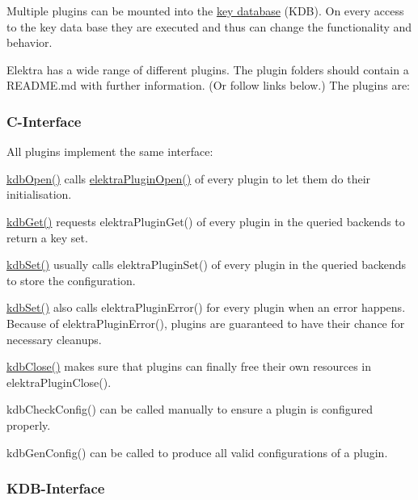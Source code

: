 Multiple plugins can be mounted into the \hyperlink{md_doc_help_elektra-glossary_doc_help_elektra-glossary_md}{key database} (K\+DB). On every access to the key data base they are executed and thus can change the functionality and behavior.

Elektra has a wide range of different plugins. The plugin folders should contain a R\+E\+A\+D\+M\+E.\+md with further information. (Or follow links below.) The plugins are\+:

 \subsubsection*{C-\/\+Interface}

All plugins implement the same interface\+:


\begin{DoxyItemize}
\item {\ttfamily \hyperlink{group__kdb_ga6808defe5870f328dd17910aacbdc6ca}{kdb\+Open()}} calls {\ttfamily \hyperlink{elektra_2plugin_8c_a32a70a7876542c51d153164ac5108a57}{elektra\+Plugin\+Open()}} of every plugin to let them do their initialisation.
\item {\ttfamily \hyperlink{group__kdb_ga28e385fd9cb7ccfe0b2f1ed2f62453a1}{kdb\+Get()}} requests {\ttfamily elektra\+Plugin\+Get()} of every plugin in the queried backends to return a key set.
\item {\ttfamily \hyperlink{group__kdb_ga11436b058408f83d303ca5e996832bcf}{kdb\+Set()}} usually calls {\ttfamily elektra\+Plugin\+Set()} of every plugin in the queried backends to store the configuration.
\item {\ttfamily \hyperlink{group__kdb_ga11436b058408f83d303ca5e996832bcf}{kdb\+Set()}} also calls {\ttfamily elektra\+Plugin\+Error()} for every plugin when an error happens. Because of {\ttfamily elektra\+Plugin\+Error()}, plugins are guaranteed to have their chance for necessary cleanups.
\item {\ttfamily \hyperlink{group__kdb_gadb54dc9fda17ee07deb9444df745c96f}{kdb\+Close()}} makes sure that plugins can finally free their own resources in {\ttfamily elektra\+Plugin\+Close()}.
\item {\ttfamily kdb\+Check\+Config()} can be called manually to ensure a plugin is configured properly.
\item {\ttfamily kdb\+Gen\+Config()} can be called to produce all valid configurations of a plugin.
\end{DoxyItemize}

\subsubsection*{K\+D\+B-\/\+Interface}



